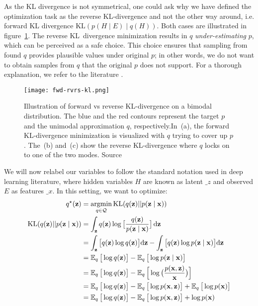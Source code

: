 As the KL divergence is not symmetrical, one could ask why we have defined the optimization task as the reverse KL-divergence and not the other way
around, i.e. forward KL divergence $\mathrm{KL}(p(H \mid E) \mid q(H))$. Both cases are illustrated in figure~\ref{fig:forward-reverse}. The reverse 
KL~divergence minimization results in $q$ \textit{under-estimating} $p$, which can be perceived as a safe choice. This choice ensures that sampling
from found $q$ provides plausible values under original $p$; in other words, we do not want to obtain samples from $q$ that the original $p$ does 
not support. For a thorough explanation, we refer to the literature \cite{another-vb-intro-2021}.
\begin{figure}[t]
    \centering
    \texttt{[image: fwd-rvrs-kl.png]}
    \caption[Forward vs reverse KL divergence]{Illustration of forward vs reverse KL-divergence on a bimodal distribution. The blue and the red contours represent the target $p$ 
    and the unimodal approximation $q$, respectively.In~(a), the forward KL-divergence minimization is visualized with $q$ trying to cover up $p$.
    The~(b) and~(c) show the reverse KL-divergence where $q$ locks on to one of the two modes. Source~\cite{another-vb-intro-2021}}
    \label{fig:forward-reverse}
\end{figure}
We will now relabel our variables to follow
the standard notation used in deep learning literature, where hidden variables $H$ are known as latent $\_{z}$ and observed $E$ as features $\_{x}$. 
In this setting, we want to optimize:
\begin{align}
    \label{eq:variational_bayes}
    q^\star(\mathbf{z}) &= \mathop{\rm argmin}_{q \in \mathcal{Q}} \mathrm{KL}(q(\mathbf{z}) || p(\mathbf{z} \mid \mathbf{x})) \\
    \mathrm{KL}(q(\mathbf{z}) || p(\mathbf{z} \mid \mathbf{x})) &= \int_\mathbf{z} q(\mathbf{z}) \log \big[ \frac{q(\mathbf{z})}{p(\mathbf{z}\mid\mathbf{x})} \big]\,\mbox{\rm d}\mathbf{z} \\
    &= \int_\mathbf{z} \big[q(\mathbf{z}) \log q(\mathbf{z})\big] \mbox{\rm d}\mathbf{z} - \int_\mathbf{z}  \big[q(\mathbf{z}) \log p(\mathbf{z}\mid \mathbf{x})\big] \mbox{\rm d}\mathbf{z} \\
    &= \operatorname{\mathbb{E}}_q \big[\log q(\mathbf{z})\big] - \operatorname{\mathbb{E}}_q \big[\log p(\mathbf{z}\mid \mathbf{x})\big] \\
    &= \operatorname{\mathbb{E}}_q \big[\log q(\mathbf{z})\big] - \operatorname{\mathbb{E}}_q \Big[\log \big( \frac{p(\mathbf{x},\mathbf{z})}{\mathbf{x}}\big) \Big] \\
    &= \operatorname{\mathbb{E}}_q \big[\log q(\mathbf{z})\big] - \operatorname{\mathbb{E}}_q \big[\log p(\mathbf{x},\mathbf{z})\big] + \operatorname{\mathbb{E}}_q \big[\log p(\mathbf{x})\big] \\
    &= \operatorname{\mathbb{E}}_q \big[\log q(\mathbf{z})\big] - \operatorname{\mathbb{E}}_q \big[\log p(\mathbf{x},\mathbf{z})\big] + \log p(\mathbf{x})
\end{align}
